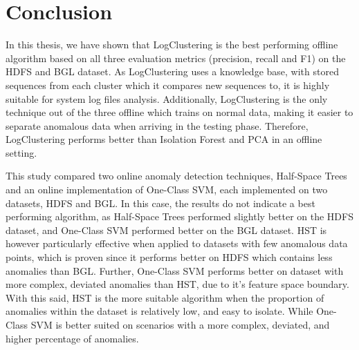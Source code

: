 

\chapter{Conclusion}
\label{cha:conclusion}

In this thesis, we have shown that LogClustering is the best performing offline algorithm based on all three evaluation metrics (precision, recall and F1) on the HDFS and BGL dataset. As LogClustering uses a knowledge base, with stored sequences from each cluster which it compares new sequences to, it is highly suitable for system log files analysis. Additionally, LogClustering is the only technique out of the three offline which trains on normal data, making it easier to separate anomalous data when arriving in the testing phase. Therefore, LogClustering performs better than Isolation Forest and PCA in an offline setting. 

This study compared two online anomaly detection techniques, Half-Space Trees and an online implementation of One-Class SVM, each implemented on two datasets, HDFS and BGL. In this case, the results do not indicate a best performing algorithm, as Half-Space Trees performed slightly better on the HDFS dataset, and One-Class SVM performed better on the BGL dataset. HST is however particularly effective when applied to datasets with few anomalous data points, which is proven since it performs better on HDFS which contains less anomalies than BGL. Further, One-Class SVM performs better on dataset with more complex, deviated anomalies than HST, due to it's feature space boundary. With this said, HST is the more suitable algorithm when the proportion of anomalies within the dataset is relatively low, and easy to isolate. While One-Class SVM is better suited on scenarios with a more complex, deviated, and higher percentage of anomalies.

